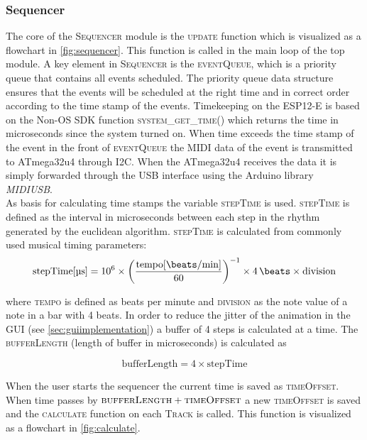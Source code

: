 \subsubsection{Sequencer}
\label{sec:sequencer}
The core of the \textsc{Sequencer} module is the \textsc{update} function which is visualized as a flowchart in \cref{fig:sequencer}. This function is called in the main loop of the top module. A key element in \textsc{Sequencer} is the \textsc{eventQueue}, which is a priority queue that contains all events scheduled. The priority queue data structure ensures that the events will be scheduled at the right time and in correct order according to the time stamp of the events.
Timekeeping on the ESP12-E is based on the Non-OS SDK function \textsc{system\_get\_time()} which returns the time in microseconds since the system turned on. When time exceeds the time stamp of the event in the front of \textsc{eventQueue} the MIDI data of the event is transmitted to ATmega32u4 through I2C. When the ATmega32u4 receives the data it is simply forwarded through the USB interface using the Arduino library \textit{MIDIUSB}.\\ 
As basis for calculating time stamps the variable \textsc{stepTime} is used. \textsc{stepTime} is defined as the interval in microseconds between each step in the rhythm generated by the euclidean algorithm. \textsc{stepTime} is calculated from commonly used musical timing parameters:
\begin{equation}\label{eq:steptimecalc}
\text{stepTime} [\SI{}{\micro\second}] = 10^6 \times
\left(\frac{
\text{tempo} [\SI[per-mode=fraction]{}{\beats\per\minute}]
}{
60
}\right)^{-1}
\times
\SI{4}{\beats} \times \text{division}    
\end{equation}

where \textsc{tempo} is defined as beats per minute and \textsc{division} as the note value of a note in a bar with 4 beats. In order to reduce the jitter of the animation in the GUI (see \cref{sec:guiimplementation}) a buffer of 4 steps is calculated at a time. The \textsc{bufferLength} (length of buffer in microseconds) is calculated as

$$
\text{bufferLength} = 4 \times \text{stepTime}
$$

When the user starts the sequencer the current time is saved as \textsc{timeOffset}. When time passes by $\textsc{bufferLength} + \textsc{timeOffset}$ a new \textsc{timeOffset} is saved and the \textsc{calculate} function on each \textsc{Track} is called. This function is visualized as a flowchart in \cref{fig:calculate}.


